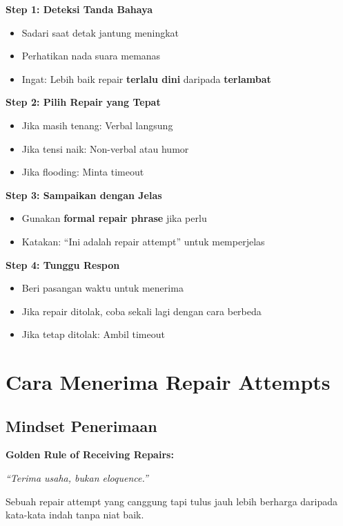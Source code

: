 \begin{praktikbox}
\textbf{Step 1: Deteksi Tanda Bahaya}
\begin{itemize}
    \item Sadari saat detak jantung meningkat
    \item Perhatikan nada suara memanas
    \item Ingat: Lebih baik repair \textbf{terlalu dini} daripada \textbf{terlambat}
\end{itemize}

\textbf{Step 2: Pilih Repair yang Tepat}
\begin{itemize}
    \item Jika masih tenang: Verbal langsung
    \item Jika tensi naik: Non-verbal atau humor
    \item Jika flooding: Minta timeout
\end{itemize}

\textbf{Step 3: Sampaikan dengan Jelas}
\begin{itemize}
    \item Gunakan \textbf{formal repair phrase} jika perlu
    \item Katakan: ``Ini adalah repair attempt'' untuk memperjelas
\end{itemize}

\textbf{Step 4: Tunggu Respon}
\begin{itemize}
    \item Beri pasangan waktu untuk menerima
    \item Jika repair ditolak, coba sekali lagi dengan cara berbeda
    \item Jika tetap ditolak: Ambil timeout
\end{itemize}
\end{praktikbox}

\section{Cara Menerima Repair Attempts}

\subsection{Mindset Penerimaan}

\begin{insightbox}
\textbf{Golden Rule of Receiving Repairs:}

\textit{``Terima usaha, bukan eloquence.''}

Sebuah repair attempt yang canggung tapi tulus jauh lebih berharga daripada kata-kata indah tanpa niat baik.
\end{insightbox}

